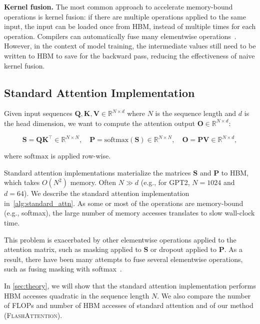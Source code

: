 \textbf{Kernel fusion.} The most common approach to accelerate memory-bound operations is kernel fusion: if there are multiple operations applied to the same input, the input can be loaded once from HBM, instead of multiple times for each operation. Compilers can automatically fuse many elementwise operations~\citep{li2020deep, paszke2019pytorch, sabne2020xla}. However, in the context of model training, the intermediate values still need to be written to HBM to save for the backward pass, reducing the effectiveness of naive kernel fusion.

\subsection{Standard Attention Implementation}
\label{subsec:standard_attn}

Given input sequences $\mathbf{Q}, \mathbf{K}, \mathbf{V} \in \mathbb{R}^{N \times d}$ where $N$ is the sequence length and $d$ is the head dimension, we want to compute the attention output $\mathbf{O} \in \mathbb{R}^{N \times d}$:

\begin{equation*}
  \mathbf{S} = \mathbf{Q} \mathbf{K}^\top \in \mathbb{R}^{N \times N}, \quad \mathbf{P} = \mathrm{softmax}(\mathbf{S}) \in \mathbb{R}^{N \times N}, \quad \mathbf{O} = \mathbf{P}\mathbf{V} \in \mathbb{R}^{N \times d},
\end{equation*}

where $\mathrm{softmax}$ is applied row-wise.

Standard attention implementations materialize the matrices $\mathbf{S}$ and $\mathbf{P}$ to HBM, which takes $O(N^2)$ memory. Often $N \gg d$ (e.g., for GPT2, $N = 1024$ and $d = 64$). We describe the standard attention implementation in~\ref{alg:standard_attn}.
As some or most of the operations are memory-bound (e.g., softmax), the large number of memory accesses translates to slow wall-clock time.

This problem is exacerbated by other elementwise operations applied to the attention matrix, such as masking applied to $\mathbf{S}$ or dropout applied to $\mathbf{P}$.
As a result, there have been many attempts to fuse several elementwise operations, such as fusing masking with softmax~\citep{shoeybi2019megatron}.

In \ref{sec:theory}, we will show that the standard attention implementation performs HBM accesses quadratic in the sequence length $N$. We also compare the number of FLOPs and number of HBM accesses of standard attention and of our method (\textsc{FlashAttention}).

